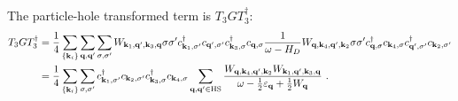 \documentclass{revtex4-2}
\begin{document}
The particle-hole transformed term is \(T_3 G T_3^\dagger\):
\begin{equation}\begin{aligned}
	T_3 G T_3^\dagger &= \frac{1}{4}\sum_{\left\{ {\bf k}_i \right\} }\sum_{{\bf q},{\bf q}^\prime}\sum_{\sigma,\sigma^\prime} W_{{\bf k}_1,{\bf q}^\prime, {\bf k}_3, {\bf q}} \sigma\sigma^\prime c^\dagger_{{\bf k}_1,\sigma^\prime} c_{{\bf q}^\prime,\sigma^\prime} c^\dagger_{{\bf k}_3,\sigma} c_{{\bf q},\sigma} \frac{1}{\omega - H_D} W_{{\bf q},{\bf k}_4, {\bf q}^\prime, {\bf k}_2} \sigma\sigma^\prime c^\dagger_{{\bf q},\sigma}c_{{\bf k}_4,\sigma}c^\dagger_{{\bf q}^\prime,\sigma^\prime}c_{{\bf k}_2,\sigma^\prime}\\
			  &= \frac{1}{4}\sum_{\left\{ {\bf k}_i \right\}}\sum_{\sigma,\sigma^\prime} c^\dagger_{{\bf k}_1,\sigma^\prime} c_{{\bf k}_2,\sigma^\prime} c^\dagger_{{\bf k}_3,\sigma}c_{{\bf k}_4,\sigma} \sum_{{\bf q}, {\bf q}^\prime \in \text{HS}}\frac{W_{{\bf q},{\bf k}_4, {\bf q}^\prime, {\bf k}_2} W_{{\bf k}_1,{\bf q}^\prime, {\bf k}_3, {\bf q}}}{\omega - \frac{1}{2}\varepsilon_{{\bf q}} + \frac{1}{2}W_{{\bf q}}}~.
\end{aligned}\end{equation}
\end{document}
